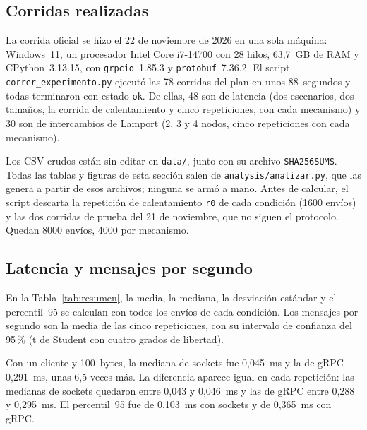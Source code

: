 \subsection{Corridas realizadas}

La corrida oficial se hizo el 22 de noviembre de 2026 en una sola máquina: Windows~11, un procesador Intel Core i7-14700 con 28 hilos, 63,7~GB de RAM y CPython~3.13.15, con \texttt{grpcio}~1.85.3 y \texttt{protobuf}~7.36.2. El script \texttt{correr\_experimento.py} ejecutó las 78 corridas del plan en unos 88~segundos y todas terminaron con estado \texttt{ok}. De ellas, 48 son de latencia (dos escenarios, dos tamaños, la corrida de calentamiento y cinco repeticiones, con cada mecanismo) y 30 son de intercambios de Lamport (2, 3 y 4 nodos, cinco repeticiones con cada mecanismo).

Los CSV crudos están sin editar en \texttt{data/}, junto con su archivo \texttt{SHA256SUMS}. Todas las tablas y figuras de esta sección salen de \texttt{analysis/analizar.py}, que las genera a partir de esos archivos; ninguna se armó a mano. Antes de calcular, el script descarta la repetición de calentamiento \texttt{r0} de cada condición (1600 envíos) y las dos corridas de prueba del 21 de noviembre, que no siguen el protocolo. Quedan 8000 envíos, 4000 por mecanismo.

\subsection{Latencia y mensajes por segundo}

\begin{table}[htbp]
  \centering
  \caption{Latencia de ida y vuelta (ms) y mensajes por segundo, sin la corrida de calentamiento}
  \label{tab:resumen}
  \resizebox{\textwidth}{!}{}
\end{table}

En la Tabla~\ref{tab:resumen}, la media, la mediana, la desviación estándar y el percentil~95 se calculan con todos los envíos de cada condición. Los mensajes por segundo son la media de las cinco repeticiones, con su intervalo de confianza del 95\,\% (t de Student con cuatro grados de libertad).

Con un cliente y 100~bytes, la mediana de sockets fue 0,045~ms y la de gRPC 0,291~ms, unas 6,5 veces más. La diferencia aparece igual en cada repetición: las medianas de sockets quedaron entre 0,043 y 0,046~ms y las de gRPC entre 0,288 y 0,295~ms. El percentil~95 fue de 0,103~ms con sockets y de 0,365~ms con gRPC.

